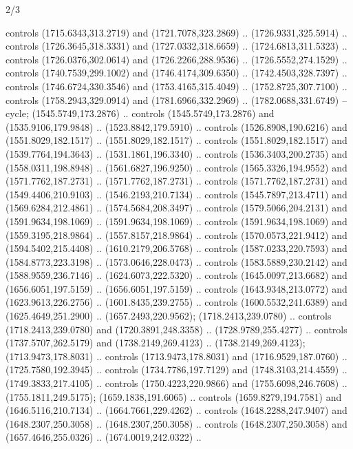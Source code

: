 \begin{flagdescription}{2/3}
\begin{scope}[shift=(c),scale=\flagwidth/391]
\begin{scope}[draw=black,fill=orange,line join=round,line cap=round,y=0.1mm, x=0.1mm,
 line width=0.001\flagwidth, yscale=-1,xscale=1,xshift=-172.5mm,yshift=-25mm]
  controls (1715.6343,313.2719) and (1721.7078,323.2869) .. (1726.9331,325.5914)
  .. controls (1726.3645,318.3331) and (1727.0332,318.6659) ..
  (1724.6813,311.5323) .. controls (1726.0376,302.0614) and (1726.2266,288.9536)
  .. (1726.5552,274.1529) .. controls (1740.7539,299.1002) and
  (1746.4174,309.6350) .. (1742.4503,328.7397) .. controls (1746.6724,330.3546)
  and (1753.4165,315.4049) .. (1752.8725,307.7100) .. controls
  (1758.2943,329.0914) and (1781.6966,332.2969) .. (1782.0688,331.6749) --
  cycle;
 (1545.5749,173.2876) .. controls (1545.5749,173.2876) and
  (1535.9106,179.9848) .. (1523.8842,179.5910) .. controls (1526.8908,190.6216)
  and (1551.8029,182.1517) .. (1551.8029,182.1517) .. controls
  (1551.8029,182.1517) and (1539.7764,194.3643) .. (1531.1861,196.3340) ..
  controls (1536.3403,200.2735) and (1558.0311,198.8948) .. (1561.6827,196.9250)
  .. controls (1565.3326,194.9552) and (1571.7762,187.2731) ..
  (1571.7762,187.2731) .. controls (1571.7762,187.2731) and (1549.4406,210.9103)
  .. (1546.2193,210.7134) .. controls (1545.7897,213.4711) and
  (1569.6284,212.4861) .. (1574.5684,208.3497) .. controls (1579.5066,204.2131)
  and (1591.9634,198.1069) .. (1591.9634,198.1069) .. controls
  (1591.9634,198.1069) and (1559.3195,218.9864) .. (1557.8157,218.9864) ..
  controls (1570.0573,221.9412) and (1594.5402,215.4408) .. (1610.2179,206.5768)
  .. controls (1587.0233,220.7593) and (1584.8773,223.3198) ..
  (1573.0646,228.0473) .. controls (1583.5889,230.2142) and (1588.9559,236.7146)
  .. (1624.6073,222.5320) .. controls (1645.0097,213.6682) and
  (1656.6051,197.5159) .. (1656.6051,197.5159) .. controls (1643.9348,213.0772)
  and (1623.9613,226.2756) .. (1601.8435,239.2755) .. controls
  (1600.5532,241.6389) and (1625.4649,251.2900) .. (1657.2493,220.9562);
 (1718.2413,239.0780) .. controls (1718.2413,239.0780) and
  (1720.3891,248.3358) .. (1728.9789,255.4277) .. controls (1737.5707,262.5179)
  and (1738.2149,269.4123) .. (1738.2149,269.4123);
 (1713.9473,178.8031) .. controls (1713.9473,178.8031) and
  (1716.9529,187.0760) .. (1725.7580,192.3945) .. controls (1734.7786,197.7129)
  and (1748.3103,214.4559) .. (1749.3833,217.4105) .. controls
  (1750.4223,220.9866) and (1755.6098,246.7608) .. (1755.1811,249.5175);
 (1659.1838,191.6065) .. controls (1659.8279,194.7581) and
  (1646.5116,210.7134) .. (1664.7661,229.4262) .. controls (1648.2288,247.9407)
  and (1648.2307,250.3058) .. (1648.2307,250.3058) .. controls
  (1648.2307,250.3058) and (1657.4646,255.0326) .. (1674.0019,242.0322) ..

\end{scope}
\end{scope}
\end{flagdescription}
